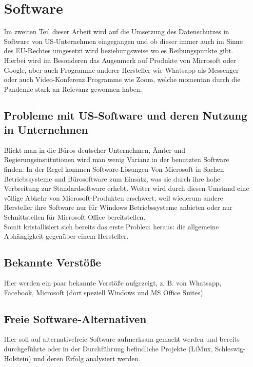 \section{Software}
Im zweiten Teil dieser Arbeit wird auf die Umsetzung des Datenschutzes in Software von US-Unternehmen eingegangen und ob dieser immer auch im Sinne des EU-Rechtes umgesetzt wird beziehungsweise wo es Reibungspunkte gibt. Hierbei wird im Besonderen das Augenmerk auf Produkte von Microsoft oder Google, aber auch Programme anderer Hersteller wie Whatsapp als Messenger oder auch Video-Konferenz Programme wie Zoom, welche momentan durch die Pandemie stark an Relevanz gewonnen haben.

\subsection{Probleme mit US-Software und deren Nutzung in Unternehmen}
Blickt man in die Büros deutscher Unternehmen, Ämter und Regierungsinstitutionen wird man wenig Varianz in der benutzten Software finden. In der Regel kommen Software-Lösungen Von Microsoft in Sachen Betriebssysteme und Bürosoftware zum Einsatz, was sie durch ihre hohe Verbreitung zur Standardsoftware erhebt. Weiter wird durch diesen Umstand eine völlige Abkehr von Microsoft-Produkten erschwert, weil wiederum andere Hersteller ihre Software nur für Windows Betriebssysteme anbieten oder nur Schnittstellen für Microsoft Office bereitstellen.\\
Somit kristallisiert sich bereits das erste Problem heraus: die allgemeine Abhängigkeit gegenüber einem Hersteller. \\


\subsection{Bekannte Verstöße}
Hier werden ein paar bekannte Verstöße aufgezeigt, z. B. von Whatsapp, Facebook, Microsoft (dort speziell Windows und MS Office Suites).

\subsection{Freie Software-Alternativen}
Hier soll auf alternativefreie Software aufmerksam gemacht werden und bereits durchgeführte oder in der Durchführung befindliche Projekte (LiMux, Schleswig-Holstein) und deren Erfolg analysiert werden.